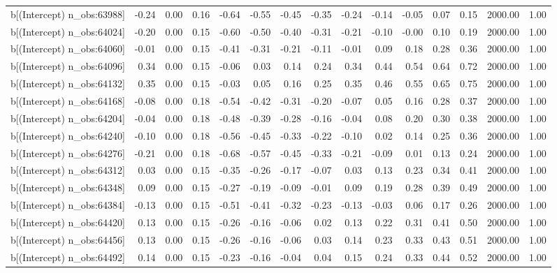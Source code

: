 \begin{table}[ht]
\begin{tabular}{rrrrrrrrrrrrrrr}
  b[(Intercept) n\_obs:63988] & -0.24 & 0.00 & 0.16 & -0.64 & -0.55 & -0.45 & -0.35 & -0.24 & -0.14 & -0.05 & 0.07 & 0.15 & 2000.00 & 1.00 \\ 
  b[(Intercept) n\_obs:64024] & -0.20 & 0.00 & 0.15 & -0.60 & -0.50 & -0.40 & -0.31 & -0.21 & -0.10 & -0.00 & 0.10 & 0.19 & 2000.00 & 1.00 \\ 
  b[(Intercept) n\_obs:64060] & -0.01 & 0.00 & 0.15 & -0.41 & -0.31 & -0.21 & -0.11 & -0.01 & 0.09 & 0.18 & 0.28 & 0.36 & 2000.00 & 1.00 \\ 
  b[(Intercept) n\_obs:64096] & 0.34 & 0.00 & 0.15 & -0.06 & 0.03 & 0.14 & 0.24 & 0.34 & 0.44 & 0.54 & 0.64 & 0.72 & 2000.00 & 1.00 \\ 
  b[(Intercept) n\_obs:64132] & 0.35 & 0.00 & 0.15 & -0.03 & 0.05 & 0.16 & 0.25 & 0.35 & 0.46 & 0.55 & 0.65 & 0.75 & 2000.00 & 1.00 \\ 
  b[(Intercept) n\_obs:64168] & -0.08 & 0.00 & 0.18 & -0.54 & -0.42 & -0.31 & -0.20 & -0.07 & 0.05 & 0.16 & 0.28 & 0.37 & 2000.00 & 1.00 \\ 
  b[(Intercept) n\_obs:64204] & -0.04 & 0.00 & 0.18 & -0.48 & -0.39 & -0.28 & -0.16 & -0.04 & 0.08 & 0.20 & 0.30 & 0.38 & 2000.00 & 1.00 \\ 
  b[(Intercept) n\_obs:64240] & -0.10 & 0.00 & 0.18 & -0.56 & -0.45 & -0.33 & -0.22 & -0.10 & 0.02 & 0.14 & 0.25 & 0.36 & 2000.00 & 1.00 \\ 
  b[(Intercept) n\_obs:64276] & -0.21 & 0.00 & 0.18 & -0.68 & -0.57 & -0.45 & -0.33 & -0.21 & -0.09 & 0.01 & 0.13 & 0.24 & 2000.00 & 1.00 \\ 
  b[(Intercept) n\_obs:64312] & 0.03 & 0.00 & 0.15 & -0.35 & -0.26 & -0.17 & -0.07 & 0.03 & 0.13 & 0.23 & 0.34 & 0.41 & 2000.00 & 1.00 \\ 
  b[(Intercept) n\_obs:64348] & 0.09 & 0.00 & 0.15 & -0.27 & -0.19 & -0.09 & -0.01 & 0.09 & 0.19 & 0.28 & 0.39 & 0.49 & 2000.00 & 1.00 \\ 
  b[(Intercept) n\_obs:64384] & -0.13 & 0.00 & 0.15 & -0.51 & -0.41 & -0.32 & -0.23 & -0.13 & -0.03 & 0.06 & 0.17 & 0.26 & 2000.00 & 1.00 \\ 
  b[(Intercept) n\_obs:64420] & 0.13 & 0.00 & 0.15 & -0.26 & -0.16 & -0.06 & 0.02 & 0.13 & 0.22 & 0.31 & 0.41 & 0.50 & 2000.00 & 1.00 \\ 
  b[(Intercept) n\_obs:64456] & 0.13 & 0.00 & 0.15 & -0.26 & -0.16 & -0.06 & 0.03 & 0.14 & 0.23 & 0.33 & 0.43 & 0.51 & 2000.00 & 1.00 \\ 
  b[(Intercept) n\_obs:64492] & 0.14 & 0.00 & 0.15 & -0.23 & -0.16 & -0.04 & 0.04 & 0.15 & 0.24 & 0.33 & 0.44 & 0.52 & 2000.00 & 1.00 \\ 

\end{tabular}
\end{table}
